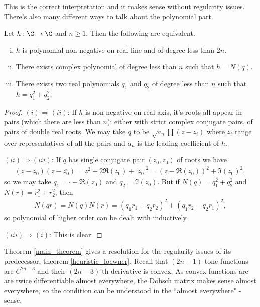 This is the correct interpretation and it makes sense without regularity issues. There's also many different ways to talk about the polynomial part.
\begin{lem}\label{polynomial_lemma}
	Let $h : \C \to \C$ and $n \geq 1$. Then the following are equivalent.
	\begin{enumerate}[(i)]
		\item $h$ is polynomial non-negative on real line and of degree less than $2 n$.
		\item There exists complex polynomial of degree less than $n$ such that $h = N(q)$.
		\item There exists two real polynomials $q_{1}$ and $q_{2}$ of degree less than $n$ such that $h = q_{1}^2 + q_{2}^2$.
	\end{enumerate}
\end{lem}
\begin{proof}
	$(i) \Rightarrow (ii)$: If $h$ is non-negative on real axis, it's roots all appear in pairs (which there are less than $n$): either with strict complex conjugate pairs, of pairs of double real roots. We may take $q$ to be $\sqrt{a_{n}}\prod (z - z_{i})$ where $z_{i}$ range over representatives of all the pairs and $a_{n}$ is the leading coefficient of $h$.

	$(ii) \Rightarrow (iii)$: If $q$ has single conjugate pair $(z_{0}, \overline{z_{0}})$ of roots we have
	\begin{align*}
		(z - z_{0}) (z - \overline{z_{0}}) = z^2 - 2 \Re(z_{0}) + |z_{0}|^2 = (z - \Re(z_{0}))^2 + \Im(z_{0})^2,
	\end{align*}
	so we may take $q_{1} = \cdot - \Re(z_{0})$ and $q_{2} = \Im(z_{0})$. But if $ N(q) = q_{1}^2 + q_{2}^2$ and $ N(r) = r_{1}^2 + r_{2}^2$, then
	\begin{align*}
		N(q r) = N(q) N(r) = (q_{1} r_{1} + q_{2} r_{2})^2 + (q_{1} r_{2} - q_{2} r_{1})^2,
	\end{align*}
	so polynomial of higher order can be dealt with inductively.

	$(iii) \Rightarrow (i)$: This is clear.
\end{proof}

Theorem \ref{main_theorem} gives a resolution for the regularity issues of its predecessor, theorem \ref{heuristic_loewner}. Recall that $(2 n - 1)$-tone functions are $C^{2 n - 3}$ and their $(2 n - 3)$'th derivative is convex. As convex functions are are twice differentiable almost everywhere, the Dobsch matrix makes sense almost everywhere, so the condition can be understood in the ``almost everywhere" -sense.

